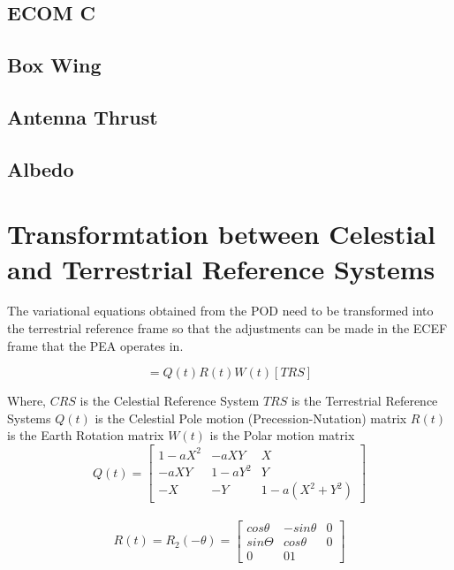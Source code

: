 \subsection{ECOM C}

\subsection{Box Wing}

\subsection{Antenna Thrust}

\subsection{Albedo}

\section{Transformtation between Celestial and Terrestrial Reference Systems}

The variational equations obtained from the POD need to be transformed into the terrestrial reference frame so that the adjustments can be made in the ECEF frame that the PEA operates in.

\begin{equation}
    [CRS] = Q(t)R(t)W(t)[TRS]
\end{equation}

Where,
$CRS$ is the Celestial Reference System
$TRS$ is the Terrestrial Reference Systems
$Q(t)$ is the Celestial Pole motion (Precession-Nutation) matrix
$R(t)$ is the Earth Rotation matrix
$W(t)$ is the Polar motion matrix
\\
\begin{equation}
Q(t) = 
\begin{bmatrix} 
1-aX^2  & -aXY     & X \\
 -aXY   & 1 - aY^2 & Y \\
 -X     & -Y       & 1-a(X^2+Y^2) 
\end{bmatrix}
\end{equation}
\\
\begin{equation}
R(t) = R_2(-\theta) = 
\begin{bmatrix}
cos \theta & -sin \theta & 0 \\
sin \Theta & cos \theta  & 0 \\
0 & 0 1
\end{bmatrix}
\end{equation}
